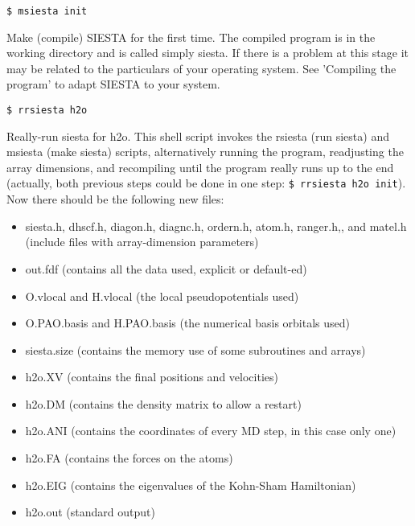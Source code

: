 {\tt \$ msiesta init}

\noindent
Make (compile) SIESTA for the first time. 
The compiled program
is in the working directory and is called simply siesta.
If there is a problem at this
stage it may be related to the particulars of your operating system.
See 'Compiling the program' to adapt SIESTA to your system.

{\tt \$ rrsiesta h2o}

\noindent
Really-run siesta for h2o. This shell script invokes the
rsiesta (run siesta) and msiesta (make siesta) scripts, 
alternatively running the program, readjusting the array dimensions,
and recompiling until the program really runs up to the end
(actually, both previous steps could be done in one
step: {\tt \$ rrsiesta h2o init}).
Now there should be the following new files:
\begin{itemize}
\item siesta.h, dhscf.h, 
diagon.h, diagnc.h, 
ordern.h, atom.h, ranger.h,,
and matel.h (include files with array-dimension parameters)
\item out.fdf
 (contains all the data used, explicit or default-ed) 
\item O.vlocal and H.vlocal
 (the local pseudopotentials used)
\item O.PAO.basis and 
H.PAO.basis
 (the numerical basis orbitals used)
\item siesta.size
 (contains the memory use of some subroutines and arrays)
\item h2o.XV
 (contains the final positions and velocities)
\item h2o.DM
 (contains the density matrix to allow a restart)
\item h2o.ANI
 (contains the coordinates of every MD step, in this case only one)
\item h2o.FA
 (contains the forces on the atoms)
\item h2o.EIG
 (contains the eigenvalues of the Kohn-Sham Hamiltonian)
\item h2o.out
 (standard output)
\end{itemize}

